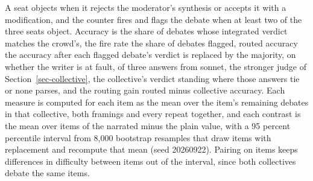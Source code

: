 A seat objects when it rejects the moderator's synthesis or accepts it with a
modification, and the counter fires and flags the debate when at least two
of the three seats object. Accuracy is the share of debates whose integrated
verdict matches the crowd's, the fire rate the share of debates flagged,
routed accuracy the accuracy after each flagged debate's verdict is replaced
by the majority, on whether the writer is at fault, of three answers from
sonnet, the stronger judge of Section~\ref{sec-collective}, the collective's
verdict standing where those answers tie or none parses, and the routing
gain routed minus collective accuracy.
Each measure is computed for each item as the mean over the item's remaining
debates in that collective, both framings and every repeat together, and
each contrast is the mean over items of the narrated minus the plain value,
with a 95 percent percentile interval from 8,000 bootstrap resamples that
draw items with replacement and recompute that mean (seed 20260922). Pairing
on items keeps differences in difficulty between items out of the interval,
since both collectives debate the same items.
